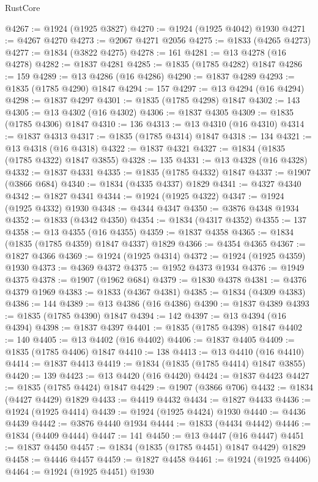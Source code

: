\begin{lexlean}{RustCore}
\begin{coremodule}
@4267 := @1924 (@1925 @3827)
@4270 := @1924 (@1925 @4042) @1930
@4271 := @4267 @4270
@4273 := @2067 @4271 @2056
@4275 := @1833 (@4265 @4273)
@4277 := @1834 (@3822 @4275)
@4278 := 161
@4281 := @13 @4278 (@16 @4278)
@4282 := @1837 @4281
@4285 := @1835 (@1785 @4282) @1847
@4286 := 159
@4289 := @13 @4286 (@16 @4286)
@4290 := @1837 @4289
@4293 := @1835 (@1785 @4290) @1847
@4294 := 157
@4297 := @13 @4294 (@16 @4294)
@4298 := @1837 @4297
@4301 := @1835 (@1785 @4298) @1847
@4302 := 143
@4305 := @13 @4302 (@16 @4302)
@4306 := @1837 @4305
@4309 := @1835 (@1785 @4306) @1847
@4310 := 136
@4313 := @13 @4310 (@16 @4310)
@4314 := @1837 @4313
@4317 := @1835 (@1785 @4314) @1847
@4318 := 134
@4321 := @13 @4318 (@16 @4318)
@4322 := @1837 @4321
@4327 := @1834 (@1835 (@1785 @4322) @1847 @3855)
@4328 := 135
@4331 := @13 @4328 (@16 @4328)
@4332 := @1837 @4331
@4335 := @1835 (@1785 @4332) @1847
@4337 := @1907 (@3866 @684)
@4340 := @1834 (@4335 @4337) @1829
@4341 := @4327 @4340
@4342 := @1827 @4341
@4344 := @1924 (@1925 @4322)
@4347 := @1924 (@1925 @4332) @1930
@4348 := @4344 @4347
@4350 := @3876 @4348 @1934
@4352 := @1833 (@4342 @4350)
@4354 := @1834 (@4317 @4352)
@4355 := 137
@4358 := @13 @4355 (@16 @4355)
@4359 := @1837 @4358
@4365 := @1834 (@1835 (@1785 @4359) @1847 @4337) @1829
@4366 := @4354 @4365
@4367 := @1827 @4366
@4369 := @1924 (@1925 @4314)
@4372 := @1924 (@1925 @4359) @1930
@4373 := @4369 @4372
@4375 := @1952 @4373 @1934
@4376 := @1949 @4375
@4378 := @1907 (@1962 @684)
@4379 := @1830 @4378
@4381 := @4376 @4379 @1969
@4383 := @1833 (@4367 @4381)
@4385 := @1834 (@4309 @4383)
@4386 := 144
@4389 := @13 @4386 (@16 @4386)
@4390 := @1837 @4389
@4393 := @1835 (@1785 @4390) @1847
@4394 := 142
@4397 := @13 @4394 (@16 @4394)
@4398 := @1837 @4397
@4401 := @1835 (@1785 @4398) @1847
@4402 := 140
@4405 := @13 @4402 (@16 @4402)
@4406 := @1837 @4405
@4409 := @1835 (@1785 @4406) @1847
@4410 := 138
@4413 := @13 @4410 (@16 @4410)
@4414 := @1837 @4413
@4419 := @1834 (@1835 (@1785 @4414) @1847 @3855)
@4420 := 139
@4423 := @13 @4420 (@16 @4420)
@4424 := @1837 @4423
@4427 := @1835 (@1785 @4424) @1847
@4429 := @1907 (@3866 @706)
@4432 := @1834 (@4427 @4429) @1829
@4433 := @4419 @4432
@4434 := @1827 @4433
@4436 := @1924 (@1925 @4414)
@4439 := @1924 (@1925 @4424) @1930
@4440 := @4436 @4439
@4442 := @3876 @4440 @1934
@4444 := @1833 (@4434 @4442)
@4446 := @1834 (@4409 @4444)
@4447 := 141
@4450 := @13 @4447 (@16 @4447)
@4451 := @1837 @4450
@4457 := @1834 (@1835 (@1785 @4451) @1847 @4429) @1829
@4458 := @4446 @4457
@4459 := @1827 @4458
@4461 := @1924 (@1925 @4406)
@4464 := @1924 (@1925 @4451) @1930

\end{coremodule}
\end{lexlean}
